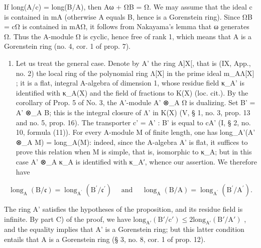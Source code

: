 If long(A/c) = long(B/A), then Aω + ΩB = Ω. We may assume that the ideal c is contained in mA (otherwise A equals B, hence is a Gorenstein ring). Since ΩB = cΩ is contained in mAΩ, it follows from Nakayama's lemma that ω generates Ω. Thus the A-module Ω is cyclic, hence free of rank 1, which means that A is a Gorenstein ring (no. 4, cor. 1 of prop. 7).

\begin{enumerate}
\def\labelenumi{\Alph{enumi})}
\setcounter{enumi}{3}
\tightlist
\item
  Let us treat the general case. Denote by A' the ring A{]}X{[}, that is (IX, App., no. 2) the local ring of the polynomial ring Λ{[}X{]} in the prime ideal m\_AΛ{[}X{]} ; it is a flat, integral A-algebra of dimension 1, whose residue field κ\_A' is identified with κ\_A(X) and the field of fractions to K(X) (loc. cit.). By the corollary of Prop. 5 of No. 3, the A'-module A' ⊗\_A Ω is dualizing. Set B' = A' ⊗\_A B; this is the integral closure of Λ' in K(X) (V, § 1, no. 3, prop. 13 and no. 5, prop. 16). The transporter c' = A' : B' is equal to cA' (I, § 2, no. 10, formula (11)). For every A-module M of finite length, one has long\_A'(A' ⊗\_A M) = long\_A(M): indeed, since the A-algebra A' is flat, it suffices to prove this relation when M is simple, that is, isomorphic to κ\_A; but in this case A' ⊗\_A κ\_A is identified with κ\_A′, whence our assertion. We therefore have
\end{enumerate}

\[
\operatorname{long} _ {\mathrm{A}} (\mathrm{B} / \mathfrak {c}) = \operatorname{long} _ {\mathrm{A} ^ {\prime}} \left(\mathrm{B} ^ {\prime} / \mathfrak {c} ^ {\prime}\right) \quad \text { and } \quad \operatorname{long} _ {\mathrm{A}} (\mathrm{B} / \mathrm{A}) = \operatorname{long} _ {\mathrm{A} ^ {\prime}} \left(\mathrm{B} ^ {\prime} / \mathrm{A} ^ {\prime}\right).
\]

The ring A' satisfies the hypotheses of the proposition, and its residue field is infinite. By part C) of the proof, we have \(\text{long}_{\text{A}'}(\text{B}'/\text{c}') \leqslant 2 \text{long}_{\text{A}'}(\text{B}'/\text{A}')\) , and the equality implies that A' is a Gorenstein ring; but this latter condition entails that A is a Gorenstein ring (§ 3, no. 8, cor. 1 of prop. 12).

